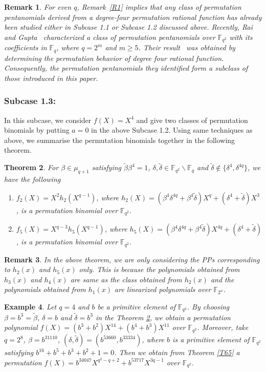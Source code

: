 \documentclass[12pt]{amsart}
\newtheorem{thm}{Theorem}[section]
\newtheorem{exmp}[thm]{Example}
\newtheorem{rmk}[thm]{Remark}
\numberwithin{equation}{section}
\theoremstyle{definition}
\newcommand{\F}{\mathbb F}
\begin{document}
\begin{rmk}
For even $q$, Remark~\ref{R1} implies that any class of permutation pentanomials derived from a degree-four permutation rational function has already been studied either in Subcase 1.1 or Subcase 1.2 discussed above. Recently, Rai and Gupta~\cite[Theorem 3.3]{Rai} characterized a class of permutation pentanomials over $\F_{q^2}$ with its coefficients in $\F_q$, where $q=2^m$ and $m \geq 5$. Their result~\cite{Rai}  was obtained by determining the permutation behavior of degree four rational function. Consequently, the permutation pentanomials they identified form a subclass of those introduced in this paper.
\end{rmk}

\subsubsection*{\textbf{Subcase 1.3:}} In this subcase, we consider  $f(X)=X^4$ and give two classes of permutation binomials by putting $a=0$ in the above Subcase 1.2. Using same techniques as above, we summarise the permutation binomials together in the following theorem.
\begin{thm}\label{T70} For $\beta \in \mu_{q+1}$ satisfying ${\tilde \beta}\beta^4=1$, $\delta, \tilde \delta \in \F_{q^2}\backslash \F_{q}$ and $\tilde \delta \not \in \{\delta^4, \delta^{4q}\}$, we have the following
 \begin{enumerate}
\item $f_2(X)=X^2 h_2(X^{q-1})$, where $h_2(X)= (\beta^4 \delta^{4q} +\beta^4  {\tilde \delta})X^q+(\delta^4+{\tilde \delta})X^3$, is a permutation binomial over $\F_{q^2}$.

\item $f_5(X)=X^{q-3}h_5(X^{q-1})$, where $h_5(X)=(\beta^4 \delta^{4q} + \beta^4{\tilde \delta})X^{4q}+(\delta^4+{\tilde \delta})$, is a permutation binomial over $\F_{q^2}$.
\end{enumerate}
\end{thm}

\begin{rmk}
 In the above theorem, we are only considering the PPs corresponding to $h_2(x)$ and $h_5(x)$ only. This is because the polynomials obtained from $h_3(x)$ and $h_4(x)$ are same as the class obtained from $h_2(x)$ and the polynomials obtained from $h_1(x)$ are linearized polynomials over $\F_{2^n}$.
\end{rmk}

\begin{exmp}\label{EX43}
Let $q=4$ and $b$ be a primitive element of $\F_{q^2}$. By choosing $\beta=b^3=\tilde{\beta}$, $\delta=b$ and $\tilde{\delta}=b^3$ in the Theorem \ref{T70},
we obtain a permutation polynomial
$f(X)=(b^3+b^2)X^{14}+(b^4+b^3)X^{11}$ over $\F_{q^2}$. Moreover, take $q=2^8$, $\beta=b^{31110}$, $(\delta, \tilde{\delta})=(b^{53660}, b^{33334})$, where $b$ is a primitive element of $\F_{q^2}$ satisfying $b^{16}+b^5+b^3+b^2+1=0$.
Then we obtain from Theorem \ref{T65} a permutation $f(X) = b^{34047}X^{q^2-q+2} +b^{53717}X^{3q-1}$ over $\F_{q^2}$.
\end{exmp}
\end{document}
